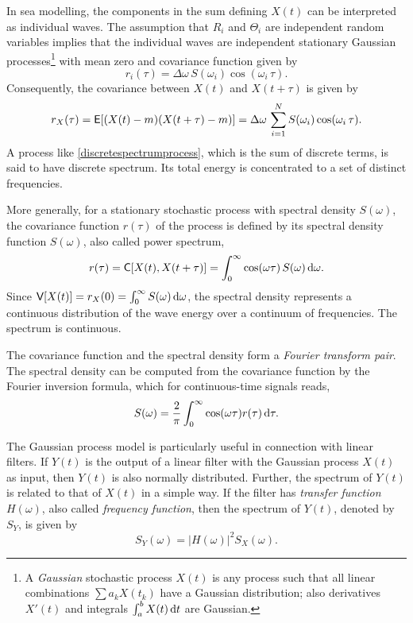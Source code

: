 In sea modelling, the components in the sum defining $X(t)$ can be
interpreted as individual waves. The assumption that $R_i$ and
$\Theta_i$ are independent random variables implies that
the individual waves are independent stationary
Gaussian processes\footnote{A \emph{Gaussian} stochastic process $X(t)$ is
any process such that all linear combinations $\sum a_k X(t_k)$ have a
Gaussian distribution; also derivatives $X'(t)$ and
integrals $\int_a^b X(t)\, \mathrm{d} t$
are Gaussian.}
with mean zero and covariance function given by
$$
r_i(\tau) = \Delta\omega \, S(\omega_i) \cos(\omega_i\,\tau).
$$
Consequently, the covariance between $X(t)$ and $X(t+\tau)$
is given by
$$
r_X(\tau) = \mbox{\sf E} [(X(t)-m)(X(t+\tau)-m)]=\Delta\omega \,\sum_{i=1}^N  S(\omega_i)
\cos(\omega_i\,\tau).
$$
A process like \eqref{discretespectrumprocess}, which is the sum of discrete terms, 
is said to have discrete spectrum.  Its total energy 
is concentrated to a set of distinct frequencies. 

More generally, for a stationary stochastic process with spectral density
$S(\omega)$, the covariance function $r(\tau)$  
of the process is defined
by its spectral density function $S(\omega)$, 
also called power spectrum,
\begin{equation}
r(\tau) = \mbox{\sf C} [X(t), X(t+\tau)] = \int_0^\infty \cos(\omega\tau)
\,S(\omega) \, \mathrm{d} \omega. \label{spec2cov}
\end{equation}
Since $\mbox{\sf V} [X(t)] = r_X(0) = \int_0^\infty S(\omega)\, \mathrm{d} \omega$,
the spectral density represents a continuous distribution of the wave energy
over a continuum of frequencies. The spectrum is continuous. 

The covariance function and the spectral density form a 
{\it Fourier transform pair}. The spectral density can 
be 
computed from the covariance function by the Fourier inversion formula, 
which for continuous-time signals reads,
\begin{equation}
S(\omega) = \frac{2}{\pi} \int_0^\infty \cos (\omega  \tau) r(\tau)\, \mathrm{d} \tau.
\label{cov2spec}
\end{equation}

The Gaussian process model is particularly useful in connection
with linear filters. 
If $Y(t)$ is the output of a linear filter
with the Gaussian process $X(t)$ as input,
then  $Y(t)$ is also normally distributed.
Further, the spectrum of $Y(t)$ is related to that of $X(t)$ in
a simple way. If the filter has {\em transfer function}
$H(\omega)$, also called 
{\em frequency function}, 
then the spectrum of $Y(t)$, denoted by $S_Y$,
is given by
$$S_Y(\omega)=|H(\omega)|^2S_X(\omega).$$

